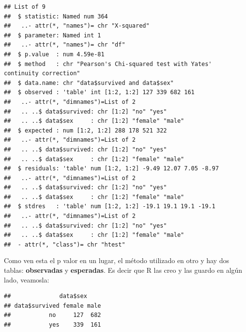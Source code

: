 \documentclass[
]{book}
\newenvironment{Shaded}{\begin{snugshade}}{\end{snugshade}}
\newcommand{\CommentTok}[1]{\textcolor[rgb]{0.56,0.35,0.01}{\textit{#1}}}
\newcommand{\NormalTok}[1]{#1}
\newcommand{\SpecialCharTok}[1]{\textcolor[rgb]{0.00,0.00,0.00}{#1}}
\begin{document}
\begin{verbatim}
## List of 9
##  $ statistic: Named num 364
##   ..- attr(*, "names")= chr "X-squared"
##  $ parameter: Named int 1
##   ..- attr(*, "names")= chr "df"
##  $ p.value  : num 4.59e-81
##  $ method   : chr "Pearson's Chi-squared test with Yates' continuity correction"
##  $ data.name: chr "data$survived and data$sex"
##  $ observed : 'table' int [1:2, 1:2] 127 339 682 161
##   ..- attr(*, "dimnames")=List of 2
##   .. ..$ data$survived: chr [1:2] "no" "yes"
##   .. ..$ data$sex     : chr [1:2] "female" "male"
##  $ expected : num [1:2, 1:2] 288 178 521 322
##   ..- attr(*, "dimnames")=List of 2
##   .. ..$ data$survived: chr [1:2] "no" "yes"
##   .. ..$ data$sex     : chr [1:2] "female" "male"
##  $ residuals: 'table' num [1:2, 1:2] -9.49 12.07 7.05 -8.97
##   ..- attr(*, "dimnames")=List of 2
##   .. ..$ data$survived: chr [1:2] "no" "yes"
##   .. ..$ data$sex     : chr [1:2] "female" "male"
##  $ stdres   : 'table' num [1:2, 1:2] -19.1 19.1 19.1 -19.1
##   ..- attr(*, "dimnames")=List of 2
##   .. ..$ data$survived: chr [1:2] "no" "yes"
##   .. ..$ data$sex     : chr [1:2] "female" "male"
##  - attr(*, "class")= chr "htest"
\end{verbatim}

Como ven esta el p valor en un lugar, el método utilizado en otro y hay dos tablas: \textbf{observadas} y \textbf{esperadas}.
Es decir que R las creo y las guardo en algún lado, veamosla:

\begin{Shaded}
\end{Shaded}

\begin{verbatim}
##              data$sex
## data$survived female male
##           no     127  682
##           yes    339  161
\end{verbatim}

\begin{Shaded}
\end{Shaded}
\end{document}
